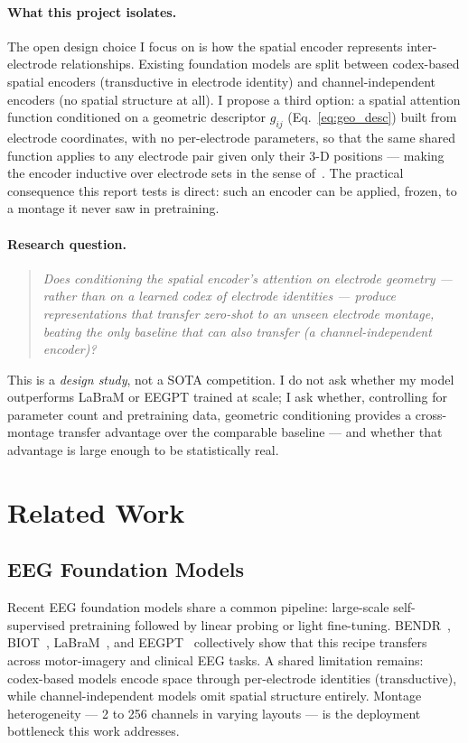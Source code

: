 \documentclass[11pt]{article}
\begin{document}
\paragraph{What this project isolates.}
The open design choice I focus on is how the spatial encoder represents
inter-electrode relationships. Existing foundation models are split between
codex-based spatial encoders (transductive in electrode identity) and
channel-independent encoders (no spatial structure at all). I propose a
third option: a spatial attention function conditioned on a geometric
descriptor $g_{ij}$ (Eq.~\ref{eq:geo_desc}) built from electrode
coordinates, with no per-electrode parameters, so that the same shared
function applies to any electrode pair given only their 3-D positions ---
making the encoder inductive over electrode sets in the sense
of~\cite{hamilton2017graphsage}. The practical consequence this report tests
is direct: such an encoder can be applied, frozen, to a montage it never saw
in pretraining.

\paragraph{Research question.}

\begin{quote}
\textit{Does conditioning the spatial encoder's attention on electrode
geometry --- rather than on a learned codex of electrode identities ---
produce representations that transfer zero-shot to an unseen electrode
montage, beating the only baseline that can also transfer (a
channel-independent encoder)?}
\end{quote}

This is a \emph{design study}, not a SOTA competition. I do not ask whether
my model outperforms LaBraM or EEGPT trained at scale; I ask whether,
controlling for parameter count and pretraining data, geometric conditioning
provides a cross-montage transfer advantage over the comparable baseline ---
and whether that advantage is large enough to be statistically real.

\section{Related Work}
\label{sec:related}

\subsection{EEG Foundation Models}
Recent EEG foundation models share a common pipeline: large-scale
self-supervised pretraining followed by linear probing or light fine-tuning.
BENDR~\cite{kostas2021bendr}, BIOT~\cite{yang2023biot},
LaBraM~\cite{jiang2024labram}, and EEGPT~\cite{wang2024eegpt} collectively
show that this recipe transfers across motor-imagery and clinical EEG tasks.
A shared limitation remains: codex-based models encode space through
per-electrode identities (transductive), while channel-independent models
omit spatial structure entirely. Montage heterogeneity --- 2 to 256 channels
in varying layouts --- is the deployment bottleneck this work addresses.
\end{document}
